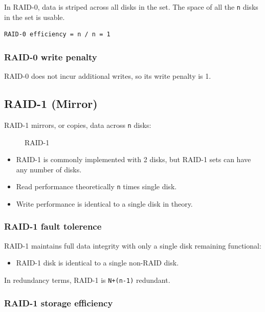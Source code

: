 In RAID-0, data is striped across all disks in the set. The space of all
the \texttt{n} disks in the set is usable.

\begin{verbatim}
RAID-0 efficiency = n / n = 1
\end{verbatim}

\subsubsection{RAID-0 write penalty}\label{raid-0-write-penalty}

RAID-0 does not incur additional writes, so its write penalty is 1.

\subsection{RAID-1 (Mirror)}\label{raid-1-mirror}

RAID-1 mirrors, or copies, data across \texttt{n} disks:

\begin{figure}
\centering
\caption{RAID-1}
\end{figure}

\begin{itemize}
\item
  RAID-1 is commonly implemented with 2 disks, but RAID-1 sets can have
  any number of disks.
\item
  Read performance theoretically \texttt{n} times single disk.
\item
  Write performance is identical to a single disk in theory.
\end{itemize}

\subsubsection{RAID-1 fault tolerence}\label{raid-1-fault-tolerence}

RAID-1 maintains full data integrity with only a single disk remaining
functional:

\begin{itemize}

\item
  RAID-1 disk is identical to a single non-RAID disk.
\end{itemize}

In redundancy terms, RAID-1 is \texttt{N+(n-1)} redundant.

\subsubsection{RAID-1 storage
efficiency}\label{raid-1-storage-efficiency}

